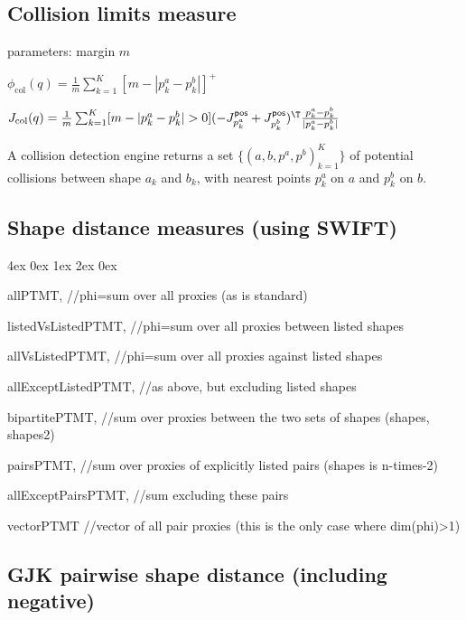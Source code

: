 \documentclass[10pt,fleqn,twoside]{article}
\newenvironment{items}{
\par\small
\begin{list}{--}{\leftmargin4ex \rightmargin0ex \labelsep1ex \labelwidth2ex
\topsep0pt \parsep0ex \itemsep3pt}
}{
\end{list}
}
\newcommand{\pos}{{\textsf{pos}}}
\begin{document}

\subsection{Collision limits measure}

parameters: margin $m$

$\phi_{\text{col}}(q) = \frac{1}{m}\sum_{k=1}^K [m-|p^a_k - p^b_k|]^+$

$J_{\text{col}}(q) = \frac{1}{m} \sum_{k=1}^K [m-|p^a_k - p^b_k|>0]
(- J^\pos_{p^a_k} + J^\pos_{p^b_k})^\T \frac{p^a_k - p^b_k}{|p^a_k - p^b_k|}$ 

A collision detection engine returns a set $\{
(a,b,p^a,p^b)_{k=1}^K \}$ of potential collisions between shape $a_k$
and $b_k$, with nearest points $p^a_k$ on $a$ and $p^b_k$ on $b$.


\subsection{Shape distance measures (using SWIFT)}

\begin{items}
\item  allPTMT, //phi=sum over all proxies (as is standard)
\item  listedVsListedPTMT, //phi=sum over all proxies between listed shapes
\item  allVsListedPTMT, //phi=sum over all proxies against listed shapes
\item  allExceptListedPTMT, //as above, but excluding listed shapes
\item  bipartitePTMT, //sum over proxies between the two sets of shapes (shapes, shapes2)
\item  pairsPTMT, //sum over proxies of explicitly listed pairs (shapes is n-times-2)
\item  allExceptPairsPTMT, //sum excluding these pairs
\item  vectorPTMT //vector of all pair proxies (this is the only case
  where dim(phi)>1)
\end{items}

\subsection{GJK pairwise shape distance (including negative)}
\end{document}

